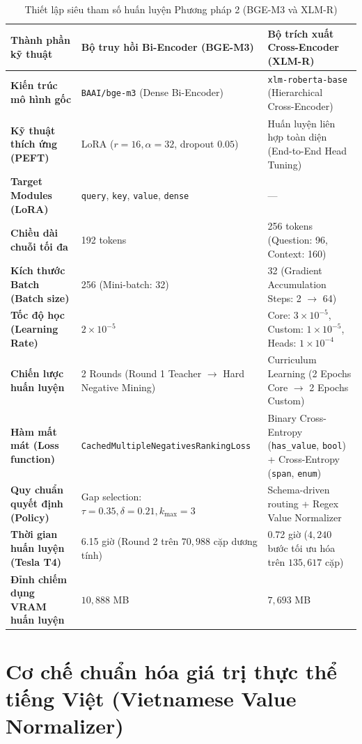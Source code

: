\begin{table}[htbp]
    \centering
    \caption{Thiết lập siêu tham số huấn luyện Phương pháp 2 (BGE-M3 và XLM-R)}
    \label{tab:bảng_4_2}
    \begin{tabular}{lll}
        \toprule
        \textbf{Thành phần kỹ thuật} & \textbf{Bộ truy hồi Bi-Encoder (BGE-M3)} & \textbf{Bộ trích xuất Cross-Encoder (XLM-R)} \\
        \midrule
        \textbf{Kiến trúc mô hình gốc} & \texttt{BAAI/bge-m3} (Dense Bi-Encoder) & \texttt{xlm-roberta-base} (Hierarchical Cross-Encoder) \\
        \textbf{Kỹ thuật thích ứng (PEFT)} & LoRA ($r=16, \alpha=32$, dropout $0.05$) & Huấn luyện liên hợp toàn diện (End-to-End Head Tuning) \\
        \textbf{Target Modules (LoRA)} & \texttt{query}, \texttt{key}, \texttt{value}, \texttt{dense} & — \\
        \textbf{Chiều dài chuỗi tối đa} & 192 tokens & 256 tokens (Question: 96, Context: 160) \\
        \textbf{Kích thước Batch (Batch size)} & 256 (Mini-batch: 32) & 32 (Gradient Accumulation Steps: 2 $\to$ 64) \\
        \textbf{Tốc độ học (Learning Rate)} & $2 \times 10^{-5}$ & Core: $3 \times 10^{-5}$, Custom: $1 \times 10^{-5}$, Heads: $1 \times 10^{-4}$ \\
        \textbf{Chiến lược huấn luyện} & 2 Rounds (Round 1 Teacher $\to$ Hard Negative Mining) & Curriculum Learning (2 Epochs Core $\to$ 2 Epochs Custom) \\
        \textbf{Hàm mất mát (Loss function)} & \texttt{CachedMultipleNegativesRankingLoss} & Binary Cross-Entropy (\texttt{has_value}, \texttt{bool}) + Cross-Entropy (\texttt{span}, \texttt{enum}) \\
        \textbf{Quy chuẩn quyết định (Policy)} & Gap selection: $\tau = 0.35, \delta = 0.21, k_{\max} = 3$ & Schema-driven routing + Regex Value Normalizer \\
        \textbf{Thời gian huấn luyện (Tesla T4)} & 6.15 giờ (Round 2 trên $70{,}988$ cặp dương tính) & 0.72 giờ ($4{,}240$ bước tối ưu hóa trên $135{,}617$ cặp) \\
        \textbf{Đỉnh chiếm dụng VRAM huấn luyện} & $10{,}888$ MB & $7{,}693$ MB \\
        \bottomrule
    \end{tabular}
\end{table}

\section{Cơ chế chuẩn hóa giá trị thực thể tiếng Việt (Vietnamese Value Normalizer)}


